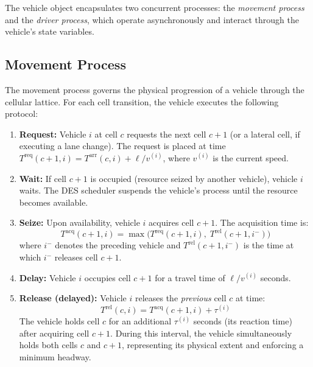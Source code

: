 \documentclass[review,authoryear]{elsarticle}
\newcommand{\Treq}{T^{\text{req}}}
\newcommand{\Tacq}{T^{\text{acq}}}
\newcommand{\Tarr}{T^{\text{arr}}}
\newcommand{\Trel}{T^{\text{rel}}}
\begin{document}
The vehicle object encapsulates two concurrent processes: the \emph{movement process} and the \emph{driver process}, which operate asynchronously and interact through the vehicle's state variables.

\subsection{Movement Process}
\label{sec:movement}

The movement process governs the physical progression of a vehicle through the cellular lattice. For each cell transition, the vehicle executes the following protocol:

\begin{enumerate}
    \item \textbf{Request:} Vehicle $i$ at cell $c$ requests the next cell $c+1$ (or a lateral cell, if executing a lane change). The request is placed at time $\Treq(c+1, i) = \Tarr(c, i) + \ell / v^{(i)}$, where $v^{(i)}$ is the current speed.

    \item \textbf{Wait:} If cell $c+1$ is occupied (resource seized by another vehicle), vehicle $i$ waits. The DES scheduler suspends the vehicle's process until the resource becomes available.

    \item \textbf{Seize:} Upon availability, vehicle $i$ acquires cell $c+1$. The acquisition time is:
    \begin{equation}
        \Tacq(c+1, i) = \max\!\big(\Treq(c+1, i),\; \Trel(c+1, i^{-})\big)
        \label{eq:acquisition}
    \end{equation}
    where $i^{-}$ denotes the preceding vehicle and $\Trel(c+1, i^{-})$ is the time at which $i^{-}$ releases cell $c+1$.

    \item \textbf{Delay:} Vehicle $i$ occupies cell $c+1$ for a travel time of $\ell / v^{(i)}$ seconds.

    \item \textbf{Release (delayed):} Vehicle $i$ releases the \emph{previous} cell $c$ at time:
    \begin{equation}
        \Trel(c, i) = \Tacq(c+1, i) + \tau^{(i)}
        \label{eq:delayed_release}
    \end{equation}
    The vehicle holds cell $c$ for an additional $\tau^{(i)}$ seconds (its reaction time) after acquiring cell $c+1$. During this interval, the vehicle simultaneously holds both cells $c$ and $c+1$, representing its physical extent and enforcing a minimum headway.
\end{enumerate}
\end{document}
